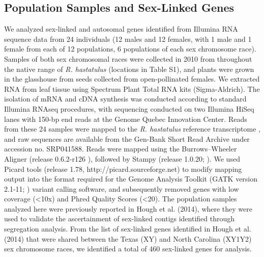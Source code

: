 \documentclass[9pt,twocolumn,twoside]{gsajnl}
\begin{document}
\subsection*{Population Samples and Sex-Linked Genes} 
We analyzed sex-linked and autosomal genes identified from Illumina RNA sequence data from 24 individuals (12 males and 12 females, with 1 male and 1 female from each of 12 populations, 6 populations of each sex chromosome race). Samples of both sex chromosomal races were collected in 2010 from throughout the native range of \textit{R. hastatulus} (locations in Table S1), and plants were grown in the glasshouse from seeds collected from open-pollinated females. We extracted RNA from leaf tissue using Spectrum Plant Total RNA kits (Sigma-Aldrich). The isolation of mRNA and cDNA synthesis was conducted according to standard Illumina RNAseq procedures, with sequencing conducted on two Illumina HiSeq lanes with 150-bp end reads at the Genome Quebec Innovation Center. Reads from these 24 samples were mapped to the \textit{R. hastatulus} reference transcriptome \citep{hough2014}, and raw sequences are available from the Gen-Bank Short Read Archive under accession no. SRP041588. Reads were mapped using the Burrows–Wheeler Aligner (release 0.6.2-r126 \citep{li2010fast}), followed by Stampy (release 1.0.20; \citep{lunter2011stampy}). We used Picard tools (release 1.78, http://picard.sourceforge.net) to modify mapping output into the format required for the Genome Analysis Toolkit (GATK version 2.1-11; \citep{mckenna2010genome}) variant calling software, and subsequently removed genes with low coverage (<10x) and Phred Quality Scores (<20). The population samples analyzed here were previously reported in Hough et al. (2014), where they were used to validate the ascertainment of sex-linked contigs identified through segregation analysis. From the list of sex-linked genes identified in Hough et al. (2014) that were shared between the Texas (XY) and North Carolina (XY1Y2) sex chromosome races, we identified a total of 460 sex-linked genes for analysis.
\end{document}
